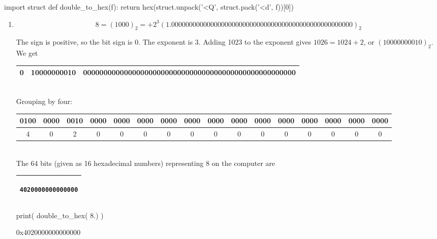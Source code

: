 \documentclass[pdftex,11pt]{article}
\begin{document}
\begin{python}
import struct
def double_to_hex(f):
  return hex(struct.unpack('<Q', struct.pack('<d', f))[0])
\end{python}






\begin{enumerate}
\item 
$$ 8 = (1000)_2 = + 2^3 (1.000000000000000000000000000000000000000000000000000)_2 $$

The sign is positive, so the bit sign is $0$.
The exponent is 3. Adding 1023 to the exponent gives $1026 = 1024 + 2$, or $(10000000010)_2.$
We get\\

\begin{tabular}{|c|c|c|}
\hline
0 & 10000000010 & 0000000000000000000000000000000000000000000000000000 \\
\hline
\end{tabular}\\

Grouping by four:\\

\begin{tabular}{|c|c|c|c|c|c|c|c|c|c|c|c|c|c|c|c|}
\hline
0100&0000&0010&0000&0000&0000&0000&0000&0000&0000&0000&0000&0000&0000&0000&0000 \\
\hline
4&0&2&0&0&0&0&0&0&0&0&0&0&0&0&0\\
\hline
\end{tabular}\\

The 64 bits  (given as 16 hexadecimal numbers) representing $8$ on the computer are
\begin{center}
\begin{tabular}{|c|}
\hline
\begin{minipage}{0.17\textwidth}
\begin{verbatim}
4020000000000000
\end{verbatim}
\end{minipage}\\
\hline
\end{tabular}
\end{center}

\begin{python}
print( double_to_hex( 8.) )
\end{python}
\begin{pythonoutput}
0x4020000000000000
\end{pythonoutput}





\end{enumerate}
\end{document}
